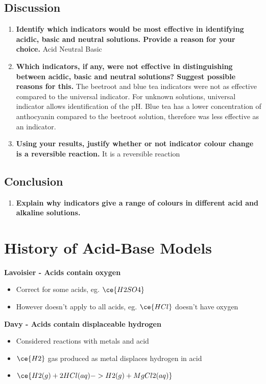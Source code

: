 	\subsection{Discussion}
		\begin{enumerate}
			\item \textbf{Identify which indicators would be most effective in identifying acidic, basic and neutral solutions. Provide 
			a reason for your choice.}
			Acid
			Neutral
			Basic
			\item \textbf{Which indicators, if any, were not effective in distinguishing between acidic, basic and neutral solutions? 
			Suggest possible reasons for this.}
			\subitem The beetroot and blue tea indicators were not as effective compared to the universal indicator. For unknown solutions, universal indicator allows identification of the pH. Blue tea has a lower concentration of anthocyanin compared to the beetroot solution, therefore was less effective as an indicator.
			\item \textbf{Using your results, justify whether or not indicator colour change is a reversible reaction.}
			\subitem It is a reversible reaction
		\end{enumerate}
	
	\subsection{Conclusion}
	\begin{enumerate}
		\item \textbf{Explain why indicators give a range of colours in different acid and alkaline solutions.}
	\end{enumerate}

\section{History of Acid-Base Models} \label{10/02/2025}
	\textbf{Lavoisier - Acids contain oxygen}
	\begin{itemize}
		\item Correct for some acids, eg. $\ce{H2SO4}$
		\item However doesn't apply to all acids, eg. $\ce{HCl}$ doesn't have oxygen
	\end{itemize}

	\textbf{Davy - Acids contain displaceable hydrogen}
	\begin{itemize}
		\item Considered reactions with metals and acid
		\item $\ce{H2}$ gas produced as metal displaces hydrogen in acid
		\item $\ce{H2(g) + 2HCl(aq) -> H2(g) + MgCl2(aq)}$
	\end{itemize}

